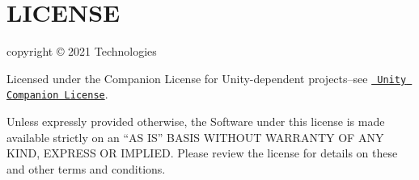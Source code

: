 \chapter{LICENSE}
\hypertarget{md__hey_tea_9_2_library_2_package_cache_2com_8unity_8cinemachine_0d2_89_87_2_l_i_c_e_n_s_e}{}\label{md__hey_tea_9_2_library_2_package_cache_2com_8unity_8cinemachine_0d2_89_87_2_l_i_c_e_n_s_e}
 copyright © 2021  Technologies

Licensed under the  Companion License for Unity-\/dependent projects--see \href{http://www.unity3d.com/legal/licenses/Unity_Companion_License}{\texttt{ Unity Companion License}}.

Unless expressly provided otherwise, the Software under this license is made available strictly on an “\+AS IS” BASIS WITHOUT WARRANTY OF ANY KIND, EXPRESS OR IMPLIED. Please review the license for details on these and other terms and conditions. 